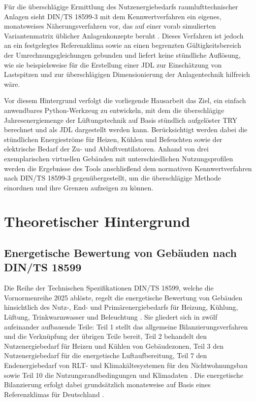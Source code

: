 \documentclass{scrreprt}
\begin{document}
Für die überschlägige Ermittlung des Nutzenergiebedarfs
raumlufttechnischer Anlagen sieht DIN/TS 18599-3 mit dem
Kennwertverfahren ein eigenes, monatsweises Näherungsverfahren vor,
das auf einer vorab simulierten Variantenmatrix üblicher
Anlagenkonzepte beruht \parencite{DIN185993}. Dieses Verfahren ist
jedoch an ein festgelegtes Referenzklima sowie an einen begrenzten
Gültigkeitsbereich der Umrechnungsgleichungen gebunden und liefert
keine stündliche Auflösung, wie sie beispielsweise für die
Erstellung einer \ac{JDL} zur Einschätzung von Lastspitzen und zur
überschlägigen Dimensionierung der Anlagentechnik hilfreich wäre.

Vor diesem Hintergrund verfolgt die vorliegende Hausarbeit das Ziel,
ein einfach anwendbares Python-Werkzeug zu entwickeln, mit dem die
überschlägige Jahresenergiemenge der Lüftungstechnik auf Basis stündlich aufgelöster \ac{TRY} berechnet und als
\ac{JDL} dargestellt werden kann. Berücksichtigt werden dabei die
stündlichen Energieströme für Heizen, Kühlen und Befeuchten sowie der
elektrische Bedarf der Zu- und Abluftventilatoren. Anhand von drei
exemplarischen virtuellen Gebäuden mit unterschiedlichen
Nutzungsprofilen werden die
Ergebnisse des Tools anschließend dem normativen Kennwertverfahren
nach DIN/TS 18599-3 gegenübergestellt, um die überschlägige Methode
einordnen und ihre Grenzen aufzeigen zu können.

\chapter{Theoretischer Hintergrund}\label{chap:Theorie}

\section{Energetische Bewertung von Gebäuden nach DIN/TS 18599}
Die Reihe der Technischen Spezifikationen DIN/TS 18599, welche die Vornormenreihe 2025 ablöste, regelt die energetische Bewertung von
Gebäuden hinsichtlich des Nutz-, End- und Primärenergiebedarfs für
Heizung, Kühlung, Lüftung, Trinkwarmwasser und Beleuchtung
\parencite{DIN1859910}. Sie gliedert sich in zwölf aufeinander
aufbauende Teile: Teil 1 stellt das allgemeine Bilanzierungsverfahren
und die Verknüpfung der übrigen Teile bereit, Teil 2 behandelt den
Nutzenergiebedarf für Heizen und Kühlen von Gebäudezonen, Teil 3 den
Nutzenergiebedarf für die energetische Luftaufbereitung, Teil 7 den
Endenergiebedarf von \ac{RLT}- und Klimakältesystemen für den
Nichtwohnungsbau sowie Teil 10 die Nutzungsrandbedingungen und
Klimadaten \parencite{DIN1859910}. Die energetische Bilanzierung
erfolgt dabei grundsätzlich monatsweise auf Basis eines
Referenzklimas für Deutschland \parencite{DIN185993}.
\end{document}
